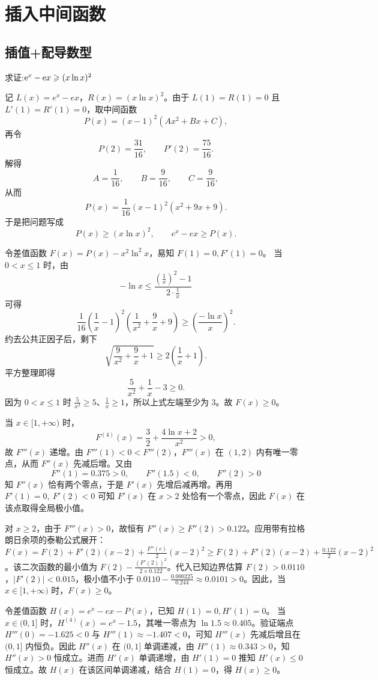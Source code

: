 \chapter{插入中间函数}
\section{插值+配导数型}
\begin{example}[证明$\e^x-\e x\geqslant (x\ln x)^2$]
    求证:$\e^x-\e x\geqslant (x\ln x)^2$
\end{example}
\begin{solution}
记 $L(x) = e^x - ex$，$R(x) = (x\ln x)^2$。由于 $L(1) = R(1) = 0$ 且 $L'(1) = R'(1) = 0$，取中间函数
\[
P(x) = (x-1)^2(Ax^2 + Bx + C),
\]
再令
\[
P(2)=\frac{31}{16},\qquad P'(2)=\frac{75}{16}.
\]
解得
\[
A=\frac{1}{16},\qquad B=\frac{9}{16},\qquad C=\frac{9}{16},
\]
从而
\[
P(x)=\frac{1}{16}(x-1)^2(x^2+9x+9).
\]
于是把问题写成
\[
P(x) \ge (x\ln x)^2,\qquad e^x - ex \ge P(x).
\]

令差值函数 $F(x) = P(x) - x^2\ln^2 x$，易知 $F(1) = 0, F'(1) = 0$。
当 $0<x\le1$ 时，由
\[
-\ln x\le \frac{\left(\frac1x\right)^2-1}{2\cdot \frac1x}
\]
可得
\[
\frac{1}{16}\left(\frac{1}{x}-1\right)^2\left(\frac{1}{x^2}+\frac{9}{x}+9\right)\ge \left(\frac{-\ln x}{x}\right)^2.
\]
约去公共正因子后，剩下
\[
\sqrt{\frac{9}{x^2}+\frac{9}{x}+1}\ge 2\left(\frac1x+1\right).
\]
平方整理即得
\[
\frac{5}{x^2}+\frac{1}{x}-3\ge0.
\]
因为 \(0<x\le1\) 时 \(\frac5{x^2}\ge5\)、\(\frac1x\ge1\)，所以上式左端至少为 \(3\)。故 \(F(x)\ge0\)。

当 $x \in [1, +\infty)$ 时，
\[
F^{(4)}(x) = \frac{3}{2} + \frac{4\ln x + 2}{x^2} > 0,
\]
故 $F'''(x)$ 递增。由 $F'''(1) < 0 < F'''(2)$，$F'''(x)$ 在 $(1,2)$ 内有唯一零点，从而 $F''(x)$ 先减后增。又由
\[
F''(1) = 0.375 > 0,\qquad F''(1.5)<0,\qquad F''(2)>0
\]
知 $F''(x)$ 恰有两个零点，于是 $F'(x)$ 先增后减再增。再用 $F'(1)=0,\ F'(2)<0$ 可知 $F'(x)$ 在 $x>2$ 处恰有一个零点，因此 $F(x)$ 在该点取得全局极小值。

对 $x \ge 2$，由于 $F'''(x) > 0$，故恒有 $F''(x) \ge F''(2) > 0.122$。应用带有拉格朗日余项的泰勒公式展开：$F(x) = F(2) + F'(2)(x-2) + \frac{F''(c)}{2}(x-2)^2 \ge F(2) + F'(2)(x-2) + \frac{0.122}{2}(x-2)^2$。该二次函数的最小值为 $F(2) - \frac{(F'(2))^2}{2 \times 0.122}$。代入已知边界估算 $F(2) > 0.0110$，$|F'(2)| < 0.015$，极小值不小于 $0.0110 - \frac{0.000225}{0.244} \approx 0.0101 > 0$。因此，当 $x \in [1, +\infty)$ 时，$F(x) \ge 0$。

令差值函数 $H(x) = e^x - ex - P(x)$，已知 $H(1) = 0, H'(1) = 0$。
当 $x \in (0, 1]$ 时，$H^{(4)}(x) = e^x - 1.5$，其唯一零点为 $\ln 1.5 \approx 0.405$。验证端点 $H'''(0) = -1.625 < 0$ 与 $H'''(1) \approx -1.407 < 0$，可知 $H'''(x)$ 先减后增且在 $(0, 1]$ 内恒负。因此 $H''(x)$ 在 $(0, 1]$ 单调递减，由 $H''(1) \approx 0.343 > 0$，知 $H''(x) > 0$ 恒成立。进而 $H'(x)$ 单调递增，由 $H'(1) = 0$ 推知 $H'(x) \le 0$ 恒成立。故 $H(x)$ 在该区间单调递减，结合 $H(1) = 0$，得 $H(x) \ge 0$。


\end{solution}
